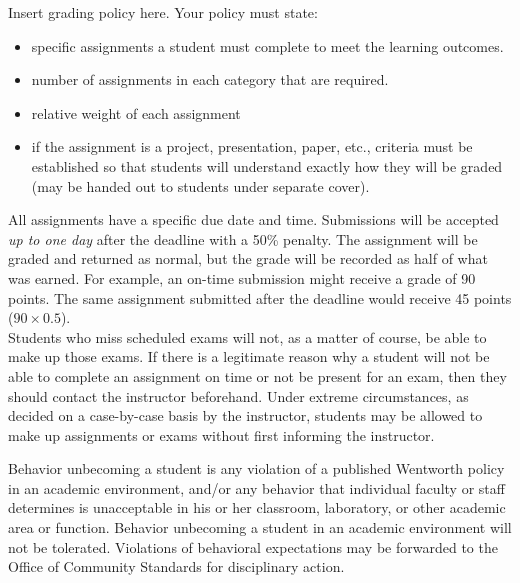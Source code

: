 \documentclass{wit_syllabus2}
\begin{document}
Insert grading policy here.  Your policy must state:
\begin{itemize}
\item specific assignments a student must complete to meet the learning outcomes.
\item number of assignments in each category that are required.
\item relative weight of each assignment
\item if the assignment is a project, presentation, paper, etc., criteria must be established so that students will understand exactly how they will be graded (may be handed out to students under separate cover).
\end{itemize}

\SyllabusGradingSystem

\SyllabusDropAdd


All assignments have a specific due date and time.  
Submissions will be accepted \textit{up to one day} after the deadline with a 50\% penalty.  
The assignment will be graded and returned as normal, but the grade will be recorded as half of what was earned.  
For example, an on-time submission might receive a grade of 90 points.  
The same assignment submitted after the deadline would receive 45 points ($90 \times 0.5$).  
\\

Students who miss scheduled exams will not, as a matter of course, be able to make up those exams.  
If there is a legitimate reason why a student will not be able to complete an assignment on time or not be present for an exam, then they should contact the instructor beforehand.  
Under extreme circumstances, as decided on a case-by-case basis by the instructor, students may be allowed to make up assignments or exams without first informing the instructor.

\SyllabusAcademicSupport

\SyllabusAcademicHonesty


Behavior unbecoming a student is any violation of a published Wentworth policy in an academic environment, and/or any behavior that individual faculty or staff determines is unacceptable in his or her classroom, laboratory, or other academic area or function. 
Behavior unbecoming a student in an academic environment will not be tolerated. 
Violations of behavioral expectations may be forwarded to the Office of Community Standards for disciplinary action.
\\
\end{document}

